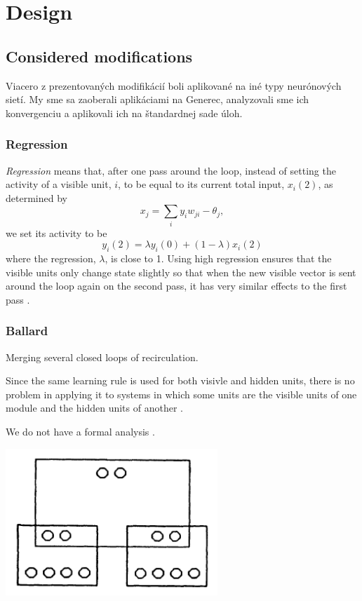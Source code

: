 
\section{Design} 

\subsection{Considered modifications}
Viacero z prezentovaných modifikácií boli aplikované na iné typy neurónových sietí. My sme sa zaoberali aplikáciami na Generec, analyzovali sme ich konvergenciu a aplikovali ich na štandardnej sade úloh. 

\subsubsection{Regression} 

\textit{Regression} means that, after one pass around the loop, instead of setting the activity of a visible unit, $i$, to be equal to its current total input, $x_i(2)$, as determined by 
$$x_j = \sum_i y_iw_{ji} - \theta_j,$$
we set its activity to be 
$$y_i(2) = \lambda y_i(0) + (1-\lambda)x_i(2)$$
where the regression, $\lambda$, is close to 1. Using high regression ensures that the visible units only change state slightly so that when the new visible vector is sent around the loop again on the second pass, it has very similar effects to the first pass \cite{hinton1988learning}.

\subsubsection{Ballard}
Merging several closed loops of recirculation. 

Since the same learning rule is used for both visivle and hidden units, there is no problem in applying it to systems in which some units are the visible units of one module and the hidden units of another \cite{hinton1988learning}. 

We do not have a formal analysis \cite{hinton1988learning}.

\includegraphics[width=8cm]{img/ballard.png}

